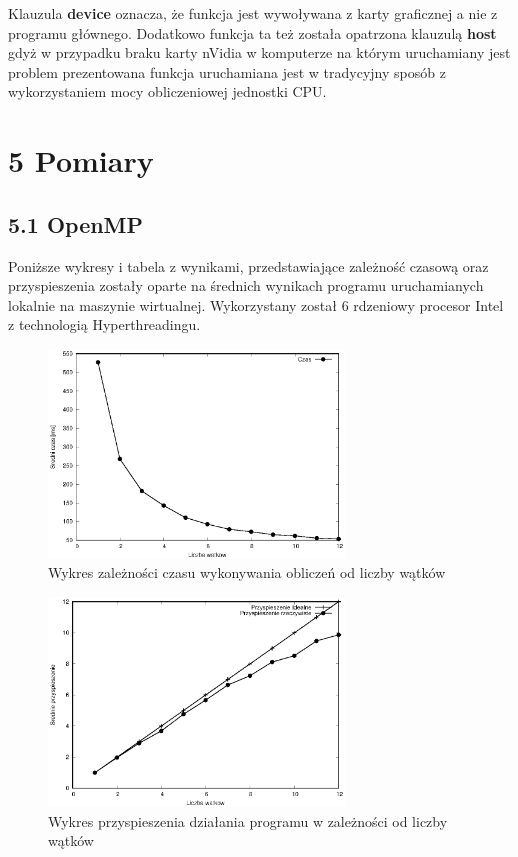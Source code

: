 \documentclass[a4paper,12pt]{article}
\begin{document}
Klauzula \textbf{device} oznacza, że funkcja jest wywoływana z karty graficznej a nie z programu głównego. Dodatkowo funkcja ta też została opatrzona klauzulą \textbf{host} gdyż w przypadku braku karty nVidia w komputerze na którym uruchamiany jest problem prezentowana funkcja uruchamiana jest w tradycyjny sposób z wykorzystaniem mocy obliczeniowej jednostki CPU.

\newpage


\section*{5 Pomiary}

\subsection*{5.1 OpenMP}

Poniższe wykresy i tabela z wynikami, przedstawiające zależność czasową oraz przyspieszenia zostały oparte na średnich wynikach programu uruchamianych lokalnie na maszynie wirtualnej. Wykorzystany został 6 rdzeniowy procesor Intel z technologią Hyperthreadingu.

\begin{figure}[!ht]
	\centering
  \includegraphics[width=0.7\textwidth]{openMPWykresCzas.eps}
  \caption{Wykres zależności czasu wykonywania obliczeń od liczby wątków}
\end{figure}

\begin{figure}[!ht]
	\centering
  \includegraphics[width=0.7\textwidth]{openMPWykresPrzyspieszenie.eps}
  \caption{Wykres przyspieszenia działania programu w zależności od liczby wątków}
\end{figure}
\end{document}
